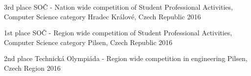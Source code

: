 

\begin{cvhonors}
			
	\cvhonor
	{3rd place}
	{SOČ - Nation wide competition of Student Professional Activities, Computer Science category}
	{Hradec Králové, Czech Republic}
	{2016}
			
	\cvhonor
	{1st place}
	{SOČ - Region wide competition of Student Professional Activities, Computer Science category}
	{Pilsen, Czech Republic}
	{2016}
			
	\cvhonor
	{2nd place}
	{Technická Olympiáda - Region wide competition in engineering}
	{Pilsen, Czech Region}
	{2016}
			
\end{cvhonors}